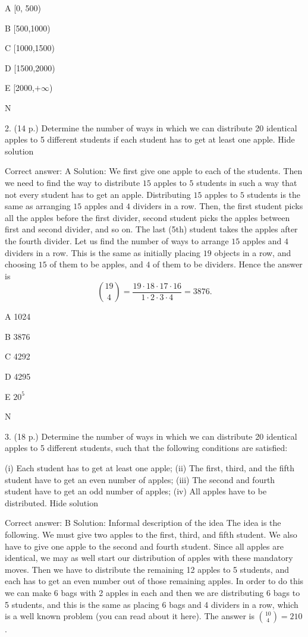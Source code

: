    A    [0, 500)

   B    [500,1000)

   C    [1000,1500)

   D    [1500,2000)

   E    [2000,\( +\infty \))

   N
	

2.	(14 p.)
	Determine the number of ways in which we can distribute 20 identical apples to 5 different students if each student has to get at least one apple.
Hide solution

Correct answer: A
Solution: We first give one apple to each of the students. Then we need to find the way to distribute \( 15 \) apples to \( 5 \) students in such a way that not every student has to get an apple. Distributing \( 15 \) apples to \( 5 \) students is the same as arranging \( 15 \) apples and \( 4 \) dividers in a row. Then, the first student picks all the apples before the first divider, second student picks the apples between first and second divider, and so on. The last (5th) student takes the apples after the fourth divider. Let us find the number of ways to arrange \( 15 \) apples and \( 4 \) dividers in a row. This is the same as initially placing \( 19 \) objects in a row, and choosing \( 15 \) of them to be apples, and \( 4 \) of them to be dividers. Hence the answer is \[ \binom{19}{4}=\frac{19\cdot 18\cdot 17\cdot 16}{1\cdot 2\cdot 3\cdot 4}=3876.\]

   A    1024

   B    3876

   C    4292

   D    4295

   E    \( 20^5 \)

   N
	

3.	(18 p.)
	Determine the number of ways in which we can distribute 20 identical apples to 5 different students, such that the following conditions are satisfied:

(i) Each student has to get at least one apple;
(ii) The first, third, and the fifth student have to get an even number of apples;
(iii) The second and fourth student have to get an odd number of apples;
(iv) All apples have to be distributed.
Hide solution

Correct answer: B
Solution: Informal description of the idea
The idea is the following. We must give two apples to the first, third, and fifth student. We also have to give one apple to the second and fourth student. Since all apples are identical, we may as well start our distribution of apples with these mandatory moves. Then we have to distribute the remaining 12 apples to 5 students, and each has to get an even number out of those remaining apples. In order to do this we can make 6 bags with 2 apples in each and then we are distributing 6 bags to 5 students, and this is the same as placing 6 bags and 4 dividers in a row, which is a well known problem (you can read about it here). The answer is \( \binom{10}4=210 \).

